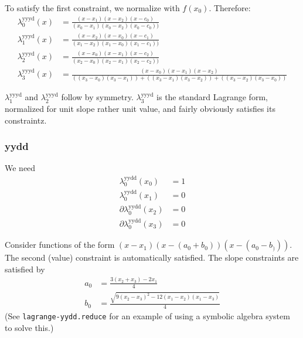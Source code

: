 To satisfy the first constraint,
we normalize with $f(x_0)$.
Therefore:
\begin{align}
\lambda^{\text{yyyd}}_0(x) & = 
\frac {(x - x_1) (x - x_2) (x - c_0)} 
{(x_0 - x_1) (x_0 - x_2) (x_0 - c_0))} 
\\
\lambda^{\text{yyyd}}_1(x) & = 
\frac {(x - x_2) (x - x_0) (x - c_1)} 
{(x_1 - x_2) (x_1 - x_0) (x_1 - c_1))} 
\nonumber \\
\lambda^{\text{yyyd}}_2(x) & = 
\frac {(x - x_0) (x - x_1) (x - c_2)} 
{(x_2 - x_0) (x_2 - x_1) (x_2 - c_2))} 
\nonumber \\
\lambda^{\text{yyyd}}_3(x) & = 
\frac {(x - x_0) (x - x_1) (x - x_2)} 
{\left( (x_3 - x_0) (x_3 - x_1) \right)
+ \left( (x_3 - x_1) (x_3 - x_2) \right)
+ \left( (x_3 - x_2) (x_3 - x_0) \right)} 
\nonumber
\end{align}

$\lambda^{\text{yyyd}}_1$ and $\lambda^{\text{yyyd}}_2$ follow by symmetry.
$\lambda^{\text{yyyd}}_3$ is the standard Lagrange form,
normalized for unit slope rather unit value, and fairly obviously
satisfies its constraintz.
 
\subsubsection{yydd}\label{sec:lagrange-yydd}

We need 
\begin{align}
\lambda^{\text{yydd}}_0(x_0) & = 1 \\ 
\lambda^{\text{yydd}}_0(x_1) & = 0 \nonumber \\
\partial\lambda^{\text{yydd}}_0(x_2) & = 0 \nonumber \\
\partial\lambda^{\text{yydd}}_0(x_3) & = 0 \nonumber 
\end{align}

Consider functions of the form $(x-x_1)(x-(a_0+b_0))(x-(a_0-b_)))$.
The second (value) constraint is automatically satisfied.
The slope constraints are satisfied by
\begin{align}
a_0 & = \frac{3 (x_2 + x_3) - 2 x_1}{4} \\ 
b_0 & = \frac{
\sqrt{ 9 (x_2 - x_3)^2 - 12 (x_1 - x_2) (x_1 -x_3)}
}
{4} \nonumber
\end{align}
(See \texttt{lagrange-yydd.reduce} for an example of using a
symbolic algebra system to solve this.)

